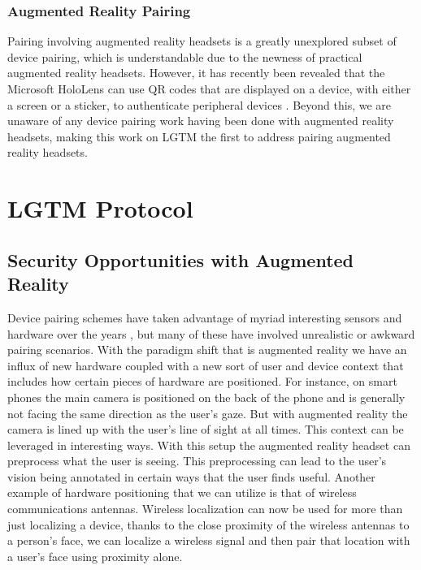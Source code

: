 \documentclass[12pt]{report}
\begin{document}
\subsection{Augmented Reality Pairing}
Pairing involving augmented reality headsets is a greatly unexplored subset of device pairing, which is understandable due to the newness of practical augmented reality headsets. However, it has recently been revealed that the Microsoft HoloLens can use QR codes that are displayed on a device, with either a screen or a sticker, to authenticate peripheral devices \cite{HoloLensVisualPairing2016}. Beyond this, we are unaware of any device pairing work having been done with augmented reality headsets, making this work on LGTM the first to address pairing augmented reality headsets. \par


\chapter{LGTM Protocol}
\section{Security Opportunities with Augmented Reality}
Device pairing schemes have taken advantage of myriad interesting sensors and hardware over the years \cite{PlayfulPairingGallego2011,BedaSoriente2007,ShakeWellBeforeUseMayrhofer2009,SeeingIsBelievingMcCune2005,TalkingToStrangersSmetters2002,LoudAndClearGoodrich2006,HapadepSoriente2008,VisualChannelPairingSaxena2006}, but many of these have involved unrealistic or awkward pairing scenarios. With the paradigm shift that is augmented reality we have an influx of new hardware coupled with a new sort of user and device context that includes how certain pieces of hardware are positioned. For instance, on smart phones the main camera is positioned on the back of the phone and is generally not facing the same direction as the user's gaze. But with augmented reality the camera is lined up with the user's line of sight at all times. This context can be leveraged in interesting ways. With this setup the augmented reality headset can preprocess what the user is seeing. This preprocessing can lead to the user's vision being annotated in certain ways that the user finds useful. Another example of hardware positioning that we can utilize is that of wireless communications antennas. Wireless localization can now be used for more than just localizing a device, thanks to the close proximity of the wireless antennas to a person's face, we can localize a wireless signal and then pair that location with a user's face using proximity alone. 
\end{document}
